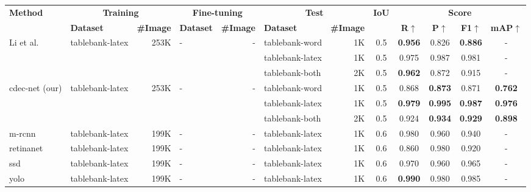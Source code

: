 \documentclass[a4paper,conference]{IEEEtran}
\begin{document}
\begin{table*}[ht!]
\addtolength{\tabcolsep}{-2.0pt}
\begin{center}
\begin{tabular}{|l| l | r|l |r|l|r| c| c c c c|} \hline
\textbf{Method} &\multicolumn{2}{|c|}{\textbf{Training}} &\multicolumn{2}{|c|}{\textbf{Fine-tuning}} &\multicolumn{2}{|c|}{\textbf{Test}} &\textbf{IoU} & \multicolumn{4}{|c|}{\textbf{Score}} \\ \cline{2-7} \cline{9-12}
  &\textbf{Dataset} &\textbf{\#Image} &\textbf{Dataset} &\textbf{\#Image} &\textbf{Dataset} &\textbf{\#Image} &  &\textbf{R}$\uparrow$ &\textbf{P}$\uparrow$ &\textbf{F1}$\uparrow$ &\textbf{mAP}$\uparrow$ \\ \hline  
Li et al.~\cite{li2019tablebank} &{\sc t}able{\sc b}ank-{\sc l}a{\sc t}e{\sc x} &253K &- &- &{\sc t}able{\sc b}ank-{\sc w}ord &1K &0.5 & \textbf{0.956} &0.826 & \textbf{0.886} &- \\ 
 & & & & &{\sc t}able{\sc b}ank-{\sc l}a{\sc t}e{\sc x} &1K &0.5 &0.975 &0.987 &0.981 &- \\
 & & & & &{\sc t}able{\sc b}ank-both &2K &0.5 & \textbf{0.962} &0.872 &0.915 &- \\ \hline
{\sc cd}e{\sc c-n}et (our) &{\sc t}able{\sc b}ank-{\sc l}a{\sc t}e{\sc x} &253K &- &- &{\sc t}able{\sc b}ank-{\sc w}ord &1K &0.5 & 0.868 & \textbf{0.873} & 0.871 & \textbf{0.762} \\  
& & & & &{\sc t}able{\sc b}ank-{\sc l}a{\sc t}e{\sc x} &1K &0.5 & \textbf{0.979} & \textbf{0.995} & \textbf{0.987} & \textbf{0.976} \\
 & & & & &{\sc t}able{\sc b}ank-both &2K &0.5 & 0.924 & \textbf{0.934} & \textbf{0.929} & \textbf{0.898} \\ \hhline{|=|=|=|=|=|=|=|=|====|}
{\sc m-rcnn}~\cite{casado2019benefits} &{\sc t}able{\sc b}ank-{\sc l}a{\sc t}e{\sc x} &199K &- &- &{\sc t}able{\sc b}ank-{\sc l}a{\sc t}e{\sc x} &1K &0.6 &0.980 &0.960 &0.940 &- \\   
{\sc r}etina{\sc n}et~\cite{casado2019benefits} &{\sc t}able{\sc b}ank-{\sc l}a{\sc t}e{\sc x} &199K &- &- &{\sc t}able{\sc b}ank-{\sc l}a{\sc t}e{\sc x} &1K &0.6 &0.860 &0.980 &0.920 &- \\   
{\sc ssd}~\cite{casado2019benefits} &{\sc t}able{\sc b}ank-{\sc l}a{\sc t}e{\sc x} &199K &- &- &{\sc t}able{\sc b}ank-{\sc l}a{\sc t}e{\sc x} &1K &0.6 &0.970 &0.960 &0.965 &- \\ 
{\sc yolo}~\cite{casado2019benefits}  &{\sc t}able{\sc b}ank-{\sc l}a{\sc t}e{\sc x} &199K &- &- &{\sc t}able{\sc b}ank-{\sc l}a{\sc t}e{\sc x} &1K &0.6 & \textbf{0.990} &0.980 &0.985 &-\\ 

\end{tabular}
\end{center}
\end{table*}
\end{document}
